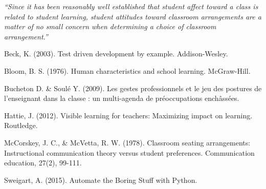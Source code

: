 \documentclass[10pt]{article}
\begin{document}
\begin{center} 
\emph{``Since it has been reasonably well established that student affect toward a class is related to student learning, student attitudes toward classroom arrangements are a matter of no small concern when determining a choice of classroom arrangement.''} \cite{MM78}
\end{center}

\begin{thebibliography}{2}

 Beck, K. (2003). Test driven development by example. Addison-Wesley.

 Bloom, B. S. (1976). Human characteristics and school learning. McGraw-Hill.

 Bucheton D. \& Soulé Y. (2009). Les gestes professionnels et le jeu des postures de l’enseignant dans la classe : un multi-agenda de préoccupations enchâssées.

 Hattie, J. (2012). Visible learning for teachers: Maximizing impact on learning. Routledge.

 McCorskey, J. C., \& McVetta, R. W. (1978). Classroom seating arrangements: Instructional communication theory versus student preferences. Communication education, 27(2), 99-111.

 Sweigart, A. (2015). Automate the Boring Stuff with Python.
\end{thebibliography}
\end{document}
